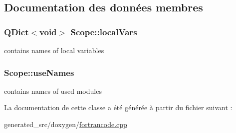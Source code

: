 \subsection{Documentation des données membres}
\hypertarget{class_scope_a6de2f3f270f07c7e66130069b778dd21}{}
\subsubsection[{local\+Vars}]{\setlength{\rightskip}{0pt plus 5cm}Q\+Dict$<$void$>$ Scope\+::local\+Vars}\label{class_scope_a6de2f3f270f07c7e66130069b778dd21}


contains names of local variables 

\hypertarget{class_scope_a7cf840d49fbb3511989cd7aa35e4d8ef}{}
\subsubsection[{use\+Names}]{ Scope\+::use\+Names}\label{class_scope_a7cf840d49fbb3511989cd7aa35e4d8ef}


contains names of used modules 



La documentation de cette classe a été générée à partir du fichier suivant \+:\begin{DoxyCompactItemize}
\item 
generated\+\_\+src/doxygen/\hyperlink{fortrancode_8cpp}{fortrancode.\+cpp}\end{DoxyCompactItemize}
